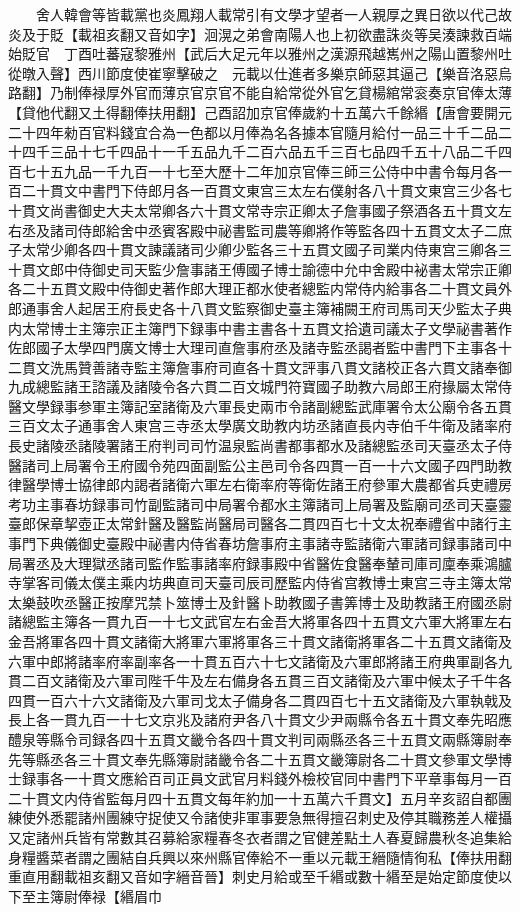 　　舍人韓會等皆載黨也炎鳳翔人載常引有文學才望者一人親厚之異日欲以代己故炎及于貶【載祖亥翻又音如字】洄滉之弟會南陽人也上初欲盡誅炎等吴湊諫救百端始貶官　丁酉吐蕃寇黎雅州【武后大足元年以雅州之漢源飛越嶲州之陽山置黎州吐從暾入聲】西川節度使崔寧擊破之　元載以仕進者多樂京師惡其逼己【樂音洛惡烏路翻】乃制俸禄厚外官而薄京官京官不能自給常從外官乞貸楊綰常衮奏京官俸太薄【貸他代翻又土得翻俸扶用翻】己酉詔加京官俸歲約十五萬六千餘緡【唐會要開元二十四年勑百官料錢宜合為一色都以月俸為名各據本官隨月給付一品三十千二品二十四千三品十七千四品十一千五品九千二百六品五千三百七品四千五十八品二千四百七十五九品一千九百一十七至大歷十二年加京官俸三師三公侍中中書令每月各一百二十貫文中書門下侍郎月各一百貫文東宫三太左右僕射各八十貫文東宫三少各七十貫文尚書御史大夫太常卿各六十貫文常寺宗正卿太子詹事國子祭酒各五十貫文左右丞及諸司侍郎給舍中丞賓客殿中祕書監司農等卿將作等監各四十五貫文太子二庶子太常少卿各四十貫文諫議諸司少卿少監各三十五貫文國子司業内侍東宫三卿各三十貫文郎中侍御史司天監少詹事諸王傅國子博士諭德中允中舍殿中袐書太常宗正卿各二十五貫文殿中侍御史著作郎大理正都水使者總監内常侍内給事各二十貫文員外郎通事舍人起居王府長史各十八貫文監察御史臺主簿補闕王府司馬司天少監太子典内太常博士主簿宗正主簿門下録事中書主書各十五貫文拾遺司議太子文學祕書著作佐郎國子太學四門廣文博士大理司直詹事府丞及諸寺監丞謁者監中書門下主事各十二貫文洗馬贊善諸寺監主簿詹事府司直各十貫文評事八貫文諸校正各六貫文諸奉御九成總監諸王諮議及諸陵令各六貫二百文城門符寶國子助教六局郎王府掾屬太常侍醫文學録事参軍主簿記室諸衛及六軍長史兩市令諸副總監武庫署令太公廟令各五貫三百文太子通事舍人東宫三寺丞太學廣文助教内坊丞諸直長内寺伯千牛衛及諸率府長史諸陵丞諸陵署諸王府判司司竹温泉監尚書都事都水及諸總監丞司天臺丞太子侍醫諸司上局署令王府國令苑四面副監公主邑司令各四貫一百一十六文國子四門助教律醫學博士協律郎内謁者諸衛六軍左右衛率府等衛佐諸王府參軍大農都省兵吏禮房考功主事春坊録事司竹副監諸司中局署令都水主簿諸司上局署及監廟司丞司天臺靈臺郎保章挈壺正太常針醫及醫監尚醫局司醫各二貫四百七十文太祝奉禮省中諸行主事門下典儀御史臺殿中祕書内侍省春坊詹事府主事諸寺監諸衛六軍諸司録事諸司中局署丞及大理獄丞諸司監作監事諸率府録事殿中省醫佐食醫奉輦司庫司廩奉乘鴻臚寺掌客司儀太僕主乘内坊典直司天臺司辰司歷監内侍省宫教博士東宫三寺主簿太常太樂鼓吹丞醫正按摩咒禁卜筮博士及針醫卜助教國子書筭博士及助教諸王府國丞尉諸總監主簿各一貫九百一十七文武官左右金吾大將軍各四十五貫文六軍大將軍左右金吾將軍各四十貫文諸衛大將軍六軍將軍各三十貫文諸衛將軍各二十五貫文諸衛及六軍中郎將諸率府率副率各一十貫五百六十七文諸衛及六軍郎將諸王府典軍副各九貫二百文諸衛及六軍司陛千牛及左右備身各五貫三百文諸衛及六軍中候太子千牛各四貫一百六十六文諸衛及六軍司戈太子備身各二貫四百七十五文諸衛及六軍執戟及長上各一貫九百一十七文京兆及諸府尹各八十貫文少尹兩縣令各五十貫文奉先昭應醴泉等縣令司録各四十五貫文畿令各四十貫文判司兩縣丞各三十五貫文兩縣簿尉奉先等縣丞各三十貫文奉先縣簿尉諸畿令各二十五貫文畿簿尉各二十貫文參軍文學博士録事各一十貫文應給百司正員文武官月料錢外檢校官同中書門下平章事每月一百二十貫文内侍省監每月四十五貫文每年約加一十五萬六千貫文】五月辛亥詔自都團練使外悉罷諸州團練守捉使又令諸使非軍事要急無得擅召刺史及停其職務差人權攝又定諸州兵皆有常數其召募給家糧春冬衣者謂之官健差點土人春夏歸農秋冬追集給身糧醬菜者謂之團結自兵興以來州縣官俸給不一重以元載王縉隨情徇私【俸扶用翻重直用翻載祖亥翻又音如字縉音晉】刺史月給或至千緡或數十緡至是始定節度使以下至主簿尉俸禄【緡眉巾